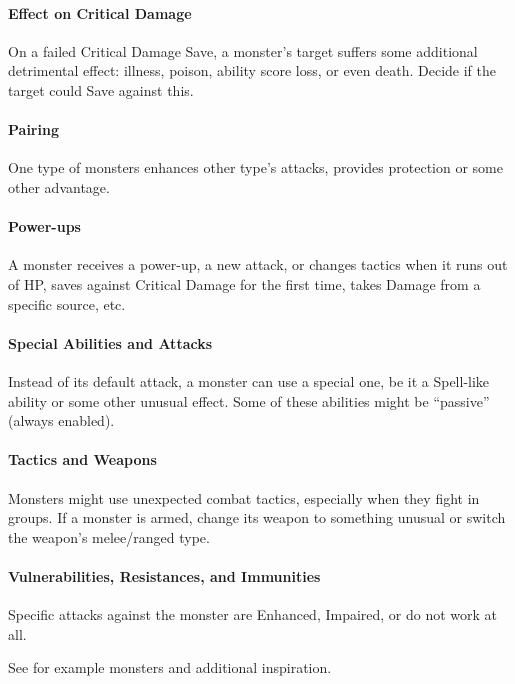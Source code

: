 \documentclass[itdr/core]{subfiles}
\begin{document}
\vfill
\paragraph{Effect on Critical Damage}
On a failed Critical Damage Save, a monster's target suffers some additional detrimental effect: illness, poison, ability score loss, or even death. Decide if the target could Save against this.

\vfill
\paragraph{Pairing}
One type of monsters enhances other type's attacks, provides protection or some other advantage.

\vfill
\paragraph{Power-ups}
A monster receives a power-up, a new attack, or changes tactics when it runs out of HP, saves against Critical Damage for the first time, takes Damage from a specific source, etc.

\vfill
\paragraph{Special Abilities and Attacks}
Instead of its default attack, a monster can use a special one, be it a Spell-like ability or some other unusual effect. Some of these abilities might be ``passive'' (always enabled).

\vfill
\paragraph{Tactics and Weapons}
Monsters might use unexpected combat tactics, especially when they fight in groups. If a monster is armed, change its weapon to something unusual or switch the weapon's melee/ranged type.\tight

\vfill
\paragraph{Vulnerabilities, Resistances, and Immunities}
Specific attacks against the monster are Enhanced, Impaired, or do not work at all.

\vfill
\begin{dbox}
	See \textbf{} for example monsters and additional inspiration.
\end{dbox}
\end{document}
